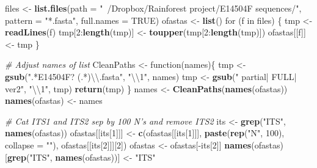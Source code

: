 \documentclass[11pt,]{article}
\newenvironment{Shaded}{\begin{snugshade}}{\end{snugshade}}
\newcommand{\KeywordTok}[1]{\textcolor[rgb]{0.13,0.29,0.53}{\textbf{{#1}}}}
\newcommand{\DataTypeTok}[1]{\textcolor[rgb]{0.13,0.29,0.53}{{#1}}}
\newcommand{\DecValTok}[1]{\textcolor[rgb]{0.00,0.00,0.81}{{#1}}}
\newcommand{\CharTok}[1]{\textcolor[rgb]{0.31,0.60,0.02}{{#1}}}
\newcommand{\StringTok}[1]{\textcolor[rgb]{0.31,0.60,0.02}{{#1}}}
\newcommand{\CommentTok}[1]{\textcolor[rgb]{0.56,0.35,0.01}{\textit{{#1}}}}
\newcommand{\OtherTok}[1]{\textcolor[rgb]{0.56,0.35,0.01}{{#1}}}
\newcommand{\NormalTok}[1]{{#1}}
\begin{document}
\begin{Shaded}
\begin{Highlighting}[]
\NormalTok{files <-}\StringTok{ }\KeywordTok{list.files}\NormalTok{(}\DataTypeTok{path =} \StringTok{"~/Dropbox/Rainforest project/E14504F sequences/"}\NormalTok{, }\DataTypeTok{pattern =} \StringTok{"*.fasta"}\NormalTok{, }\DataTypeTok{full.names =} \OtherTok{TRUE}\NormalTok{)}
\NormalTok{ofastas <-}\StringTok{ }\KeywordTok{list}\NormalTok{()}
\NormalTok{for (f in files) \{}
  \NormalTok{tmp <-}\StringTok{ }\KeywordTok{readLines}\NormalTok{(f)}
  \NormalTok{tmp[}\DecValTok{2}\NormalTok{:}\KeywordTok{length}\NormalTok{(tmp)] <-}\StringTok{ }\KeywordTok{toupper}\NormalTok{(tmp[}\DecValTok{2}\NormalTok{:}\KeywordTok{length}\NormalTok{(tmp)])}
  \NormalTok{ofastas[[f]] <-}\StringTok{ }\NormalTok{tmp}
\NormalTok{\}}

\CommentTok{# Adjust names of list}
\NormalTok{CleanPaths <-}\StringTok{ }\NormalTok{function(names)\{}
  \NormalTok{tmp <-}\StringTok{ }\KeywordTok{gsub}\NormalTok{(}\StringTok{".*E14504F? (.*)}\CharTok{\textbackslash{}\textbackslash{}}\StringTok{.fasta"}\NormalTok{, }\StringTok{"}\CharTok{\textbackslash{}\textbackslash{}}\StringTok{1"}\NormalTok{, names)}
  \NormalTok{tmp <-}\StringTok{ }\KeywordTok{gsub}\NormalTok{(}\StringTok{" partial| FULL| ver2"}\NormalTok{, }\StringTok{"}\CharTok{\textbackslash{}\textbackslash{}}\StringTok{1"}\NormalTok{, tmp)}
  \KeywordTok{return}\NormalTok{(tmp)}
\NormalTok{\}}
\NormalTok{names <-}\StringTok{ }\KeywordTok{CleanPaths}\NormalTok{(}\KeywordTok{names}\NormalTok{(ofastas))}
\KeywordTok{names}\NormalTok{(ofastas) <-}\StringTok{ }\NormalTok{names}

\CommentTok{# Cat ITS1 and ITS2 sep by 100 N's and remove ITS2}
\NormalTok{its <-}\StringTok{ }\KeywordTok{grep}\NormalTok{(}\StringTok{"ITS"}\NormalTok{, }\KeywordTok{names}\NormalTok{(ofastas))}
\NormalTok{ofastas[[its[}\DecValTok{1}\NormalTok{]]] <-}\StringTok{ }\KeywordTok{c}\NormalTok{(ofastas[[its[}\DecValTok{1}\NormalTok{]]], }\KeywordTok{paste}\NormalTok{(}\KeywordTok{rep}\NormalTok{(}\StringTok{"N"}\NormalTok{, }\DecValTok{100}\NormalTok{), }\DataTypeTok{collapse =} \StringTok{""}\NormalTok{), ofastas[[its[}\DecValTok{2}\NormalTok{]]][}\DecValTok{2}\NormalTok{])}
\NormalTok{ofastas <-}\StringTok{ }\NormalTok{ofastas[-its[}\DecValTok{2}\NormalTok{]]}
\KeywordTok{names}\NormalTok{(ofastas)[}\KeywordTok{grep}\NormalTok{(}\StringTok{"ITS"}\NormalTok{, }\KeywordTok{names}\NormalTok{(ofastas))] <-}\StringTok{ "ITS"}
\end{Highlighting}
\end{Shaded}
\end{document}
